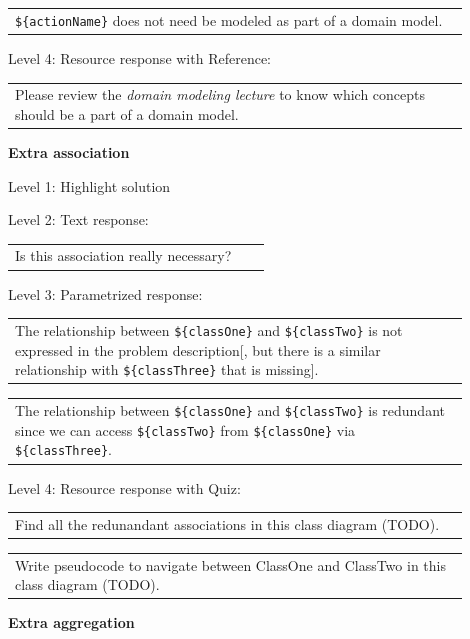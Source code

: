 \begin{tabular}{|p{0.9\linewidth}}
\verb|${actionName}| does not need be modeled as part of a domain model.
\end{tabular} \medskip

\noindent Level 4: Resource response with Reference: \medskip

\begin{tabular}{|p{0.9\linewidth}}
Please review the \textit{domain modeling lecture} to know which concepts should be a part of a domain model.
\end{tabular} \medskip


\noindent \textbf{Extra association} \medskip

\noindent Level 1: Highlight solution \medskip

\noindent Level 2: Text response: \medskip

\begin{tabular}{|p{0.9\linewidth}}
Is this association really necessary?
\end{tabular} \medskip

\noindent Level 3: Parametrized response: \medskip

\begin{tabular}{|p{0.9\linewidth}}
The relationship between \verb|${classOne}| and \verb|${classTwo}| is not expressed in the problem description[, but there is a similar relationship with \verb|${classThree}| that is missing].
\end{tabular} \medskip

\begin{tabular}{|p{0.9\linewidth}}
The relationship between \verb|${classOne}| and \verb|${classTwo}| is redundant since we can access \verb|${classTwo}| from \verb|${classOne}| via \verb|${classThree}|.
\end{tabular} \medskip

\noindent Level 4: Resource response with Quiz: \medskip

\begin{tabular}{|p{0.9\linewidth}}
Find all the redunandant associations in this class diagram (TODO).
\end{tabular} \medskip



\begin{tabular}{|p{0.9\linewidth}}
Write pseudocode to navigate between ClassOne and ClassTwo in this class diagram (TODO).
\end{tabular} \medskip


\noindent \textbf{Extra aggregation} \medskip

